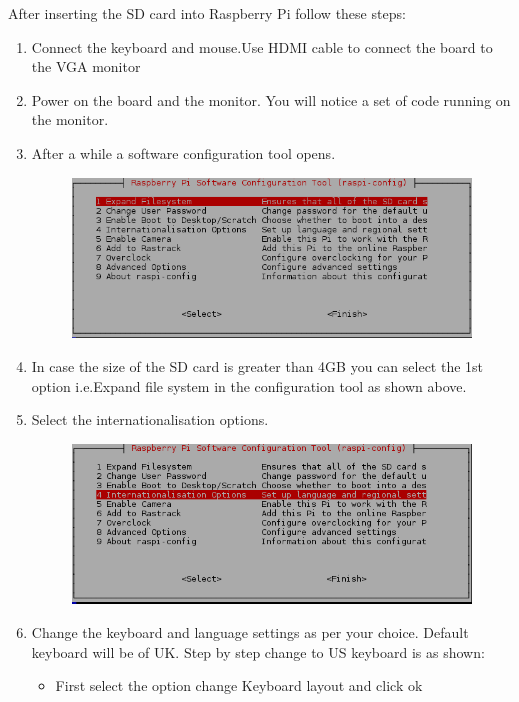 \documentclass[11pt,a4paper]{report}
\begin{document}
	After inserting the SD card into Raspberry Pi follow these steps:
	\begin{enumerate}
		\item Connect the keyboard and mouse.Use HDMI cable to connect the board to the VGA monitor
		\item Power on the board and the monitor. You will notice a set of code running on the monitor.
		\item After a while a software configuration tool opens.
			\begin{figure}[h!]
				\includegraphics[scale=0.6]{2.PNG}
				\centering
			\end{figure}
		\item In case the size of the SD card is greater than 4GB you can select the 1st option i.e.Expand file system in the configuration tool as shown above.	
		\item Select the internationalisation options.
			\begin{figure}[h!]
				\includegraphics[scale=0.6]{3.PNG}
				\centering
			\end{figure}
		\item Change the keyboard and language settings as per your choice. Default keyboard will be of UK. Step by step change to US keyboard is as shown:
		\begin{itemize}
		\item First select the option change Keyboard layout and click ok
			\begin{figure}[h!]

\end{figure}
\end{itemize}
\end{enumerate}
\end{document}
